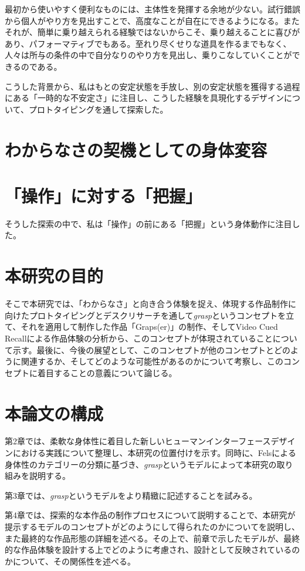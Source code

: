 最初から使いやすく便利なものには、主体性を発揮する余地が少ない。試行錯誤から個人がやり方を見出すことで、高度なことが自在にできるようになる。またそれが、簡単に乗り越えられる経験ではないからこそ、乗り越えることに喜びがあり、パフォーマティブでもある。至れり尽くせりな道具を作るまでもなく、人々は所与の条件の中で自分なりのやり方を見出し、乗りこなしていくことができるのである。

こうした背景から、私はもとの安定状態を手放し、別の安定状態を獲得する過程にある「一時的な不安定さ」に注目し、こうした経験を具現化するデザインについて、プロトタイピングを通して探索した。

\section*{わからなさの契機としての身体変容}

\section*{「操作」に対する「把握」}
そうした探索の中で、私は「操作」の前にある「把握」という身体動作に注目した。

\section{本研究の目的}
そこで本研究では、「わからなさ」と向き合う体験を捉え、体現する作品制作に向けたプロトタイピングとデスクリサーチを通して\textit{grasp}というコンセプトを立て、それを適用して制作した作品「Graps(er)」の制作、そしてVideo Cued Recallによる作品体験の分析から、このコンセプトが体現されていることについて示す。最後に、今後の展望として、このコンセプトが他のコンセプトとどのように関連するか、そしてどのような可能性があるのかについて考察し、このコンセプトに着目することの意義について論じる。

\section{本論文の構成}
第2章では、柔軟な身体性に着目した新しいヒューマンインターフェースデザインにおける実践について整理し、本研究の位置付けを示す。同時に、Felsによる身体性のカテゴリーの分類に基づき、\textit{grasp}というモデルによって本研究の取り組みを説明する。

第3章では、\textit{grasp}というモデルをより精緻に記述することを試みる。

第4章では、探索的な本作品の制作プロセスについて説明することで、本研究が提示するモデルのコンセプトがどのようにして得られたのかについてを説明し、また最終的な作品形態の詳細を述べる。その上で、前章で示したモデルが、最終的な作品体験を設計する上でどのように考慮され、設計として反映されているのかについて、その関係性を述べる。

